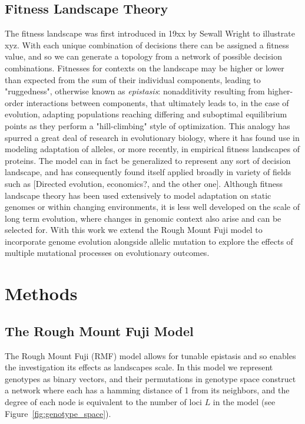 \documentclass[paper=a4, fontsize=11pt,twoside]{scrartcl}       %
\begin{document}
\subsection*{Fitness Landscape Theory}

The fitness landscape was first introduced in 19xx by Sewall Wright to illustrate xyz. With each unique combination of decisions there can be assigned a fitness value, and so we can generate a topology from a network of possible decision combinations. Fitnesses for contexts on the landscape may be higher or lower than expected from the sum of their individual components, leading to "ruggedness", otherwise known as \textit{epistasis}: nonadditivity resulting from higher-order interactions between components, that ultimately leads to, in the case of evolution, adapting populations reaching differing and suboptimal equilibrium points as they perform a "hill-climbing" style of optimization. This analogy has spurred a great deal of research in evolutionary biology, where it has found use in modeling adaptation of alleles, or more recently, in empirical fitness landscapes of proteins. The model can in fact be generalized to represent any sort of decision landscape, and has consequently found itself applied broadly in variety of fields such as [Directed evolution, economics?, and the other one]. Although fitness landscape theory has been used extensively to model adaptation on static genomes or within changing environments, it is less well developed on the scale of long term evolution, where changes in genomic context also arise and can be selected for. With this work we extend the Rough Mount Fuji model to incorporate genome evolution alongside allelic mutation to explore the effects of multiple mutational processes on evolutionary outcomes.

\section*{Methods}

\subsection*{The Rough Mount Fuji Model}

The Rough Mount Fuji (RMF) model allows for tunable epistasis \cite{neidhartAdaptationTunablyRugged2014} and so enables the investigation its effects as landscapes scale. In this model we represent genotypes as binary vectors, and their permutations in genotype space construct a network where each has a hamming distance of 1 from its neighbors, and the degree of each node is equivalent to the number of loci $L$ in the model (see Figure~\ref{fig:genotype_space}).
\end{document}
